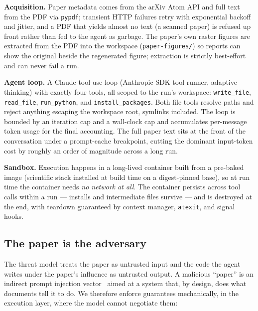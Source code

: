 \documentclass[10pt]{article}
\begin{document}
\textbf{Acquisition.} Paper metadata comes from the arXiv Atom API and full text from the PDF via \texttt{pypdf}; transient HTTP failures retry with exponential backoff and jitter, and a PDF that yields almost no text (a scanned paper) is refused up front rather than fed to the agent as garbage. The paper's own raster figures are extracted from the PDF into the workspace (\texttt{paper-figures/}) so reports can show the original beside the regenerated figure; extraction is strictly best-effort and can never fail a run.

\textbf{Agent loop.} A Claude tool-use loop (Anthropic SDK tool runner, adaptive thinking) with exactly four tools, all scoped to the run's workspace: \texttt{write\_file}, \texttt{read\_file}, \texttt{run\_python}, and \texttt{install\_packages}. Both file tools resolve paths and reject anything escaping the workspace root, symlinks included. The loop is bounded by an iteration cap and a wall-clock cap and accumulates per-message token usage for the final accounting. The full paper text sits at the front of the conversation under a prompt-cache breakpoint, cutting the dominant input-token cost by roughly an order of magnitude across a long run.

\textbf{Sandbox.} Execution happens in a long-lived container built from a pre-baked image (scientific stack installed at build time on a digest-pinned base), so at run time the container needs \emph{no network at all}. The container persists across tool calls within a run --- installs and intermediate files survive --- and is destroyed at the end, with teardown guaranteed by context manager, \texttt{atexit}, and signal hooks.

\subsection{The paper is the adversary}\label{sec:threat}

The threat model treats the paper as untrusted input and the code the agent writes under the paper's influence as untrusted output. A malicious ``paper'' is an indirect prompt injection vector~\cite{greshake2023} aimed at a system that, by design, does what documents tell it to do. We therefore enforce guarantees mechanically, in the execution layer, where the model cannot negotiate them:
\end{document}
